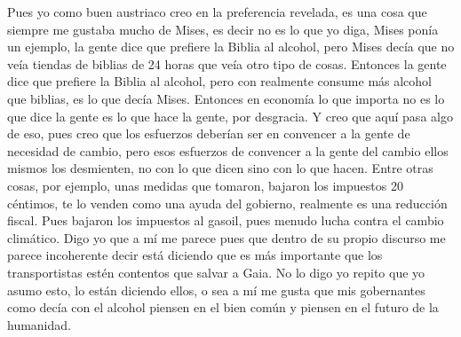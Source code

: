 Pues yo como buen austriaco creo en la preferencia revelada, es una cosa que siempre me gustaba mucho de Mises, es decir no es lo que yo diga, Mises ponía un ejemplo, la gente dice que prefiere la Biblia al alcohol, pero Mises decía que no veía tiendas de biblias de 24 horas que veía otro tipo de cosas. Entonces la gente dice que prefiere la Biblia al alcohol, pero con realmente consume más alcohol que biblias, es lo que decía Mises. Entonces en economía lo que importa no es lo que dice la gente es lo que hace la gente, por desgracia. Y creo que aquí pasa algo de eso, pues creo que los esfuerzos deberían ser en convencer a la gente de necesidad de cambio, pero esos esfuerzos de convencer a la gente del cambio ellos mismos los desmienten, no con lo que dicen sino con lo que hacen. Entre otras cosas, por ejemplo, unas medidas que tomaron, bajaron los impuestos 20 céntimos, te lo venden como una ayuda del gobierno, realmente es una reducción fiscal. Pues bajaron los impuestos al gasoil, pues menudo lucha contra el cambio climático. Digo yo que a mí me parece pues que dentro de su propio discurso me parece incoherente decir está diciendo que es más importante que los transportistas estén contentos que salvar a Gaia. No lo digo yo repito que yo asumo esto, lo están diciendo ellos, o sea a mí me gusta que mis gobernantes como decía con el alcohol piensen en el bien común y piensen en el futuro de la humanidad.

